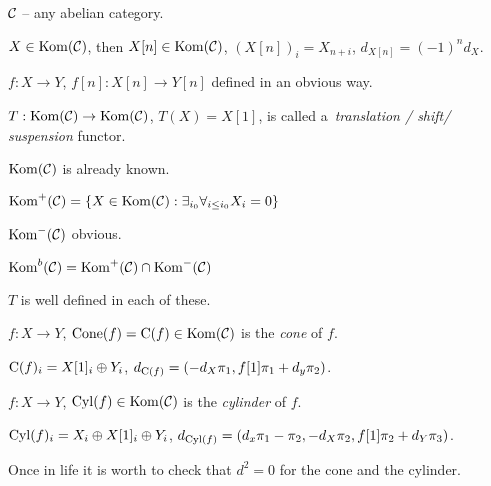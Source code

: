 



	$\mathcal{C}$ -- any abelian category.
	
	\begin{definition}
		$X \in \operatorname{Kom}(\mathcal{C})$, then $X[n] \in \operatorname{Kom}(\mathcal{C})$, $(X[n])_i = X_{n+i}$,
		$d_{X[n]} = (-1)^n d_X$.
		
		$f:X \to Y$, $f[n] : X[n] \to Y[n]$ defined in an obvious way.
		
		$T: \operatorname{Kom}(\mathcal{C}) \to \operatorname{Kom}(\mathcal{C})$, $T(X) = X[1]$, is called
		a~\emph{translation / shift/ suspension} functor.
	\end{definition}
	
	\begin{definition}
		$\operatorname{Kom}(\mathcal{C})$ is already known.
		
		$\operatorname{Kom}^+(\mathcal{C}) = \{ X \in \operatorname{Kom}(\mathcal{C}) : \exists_{i_0} \forall_{i \leq i_0} X_i = 0 \}$
		
		$\operatorname{Kom}^-(\mathcal{C})$ obvious.
		
		$\operatorname{Kom}^b(\mathcal{C}) = \operatorname{Kom}^+(\mathcal{C}) \cap \operatorname{Kom}^-(\mathcal{C})$
	\end{definition}
	
	\begin{remark}
		$T$ is well defined in each of these.
	\end{remark}
	
	\begin{definition}[cone]
		$f: X \to Y$, ${\mathrm{Cone}}(f) = {\mathrm{C}}(f)  \in \operatorname{Kom}(\mathcal{C})$ is the
		\emph{cone} of $f$.
		
		$\operatorname{C}(f)_i = X[1]_i \oplus Y_i$, $d_{\operatorname{C}(f)} = 
		(-d_X \pi_1, f[1] \pi_1 + d_y \pi_2)$.
	\end{definition}
	
	\begin{definition}[cylinder]
		$f:X \to Y$, $\operatorname{Cyl}(f) \in \operatorname{Kom}(\mathcal{C})$ is the \emph{cylinder} of $f$.
		
		$\operatorname{Cyl}(f)_i = X_i \oplus X[1]_i \oplus Y_i$, $d_{\operatorname{Cyl}(f)} =
		(d_x \pi_1 - \pi_2, - d_X \pi_2, f[1] \pi_2 + d_Y \pi_3)$.
	\end{definition}
	
	\begin{remark}
		Once in life it is worth to check that $d^2=0$ for the cone and the cylinder.
	\end{remark}
	
